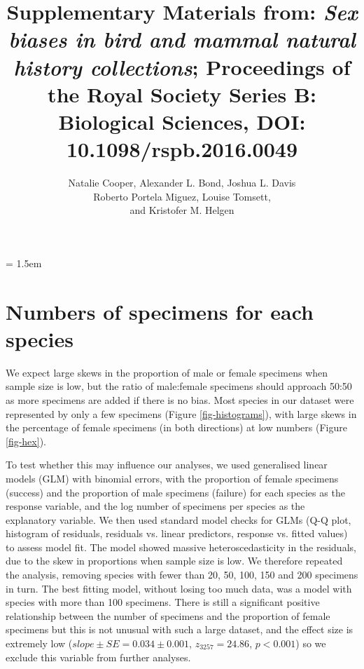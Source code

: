 \documentclass[a4paper, 12pt]{article}
\title{Supplementary Materials from: \textit{Sex biases in bird and mammal natural history collections}; Proceedings of the Royal Society Series B: Biological Sciences, DOI: 10.1098/rspb.2016.0049}
\author{Natalie Cooper, 
  Alexander L. Bond,
  Joshua L. Davis\\
  Roberto Portela Miguez,
  Louise Tomsett, \\ and
  Kristofer M. Helgen}
\date{}
\begin{document}
\maketitle

\tableofcontents

\parindent = 1.5em
\addtolength{\parskip}{.3em}


\newpage
\section{Numbers of specimens for each species}

We expect large skews in the proportion of male or female specimens when sample size is low, but the ratio of male:female specimens should approach 50:50 as more specimens are added if there is no bias. 
Most species in our dataset were represented by only a few specimens (Figure \ref{fig-histograms}), with large skews in the percentage of female specimens (in both directions) at low numbers (Figure \ref{fig-hex}).

To test whether this may influence our analyses, we used generalised linear models (GLM) with binomial errors, with the proportion of female specimens (success) and the proportion of male specimens (failure) for each species as the response variable, and the log number of specimens per species as the explanatory variable. 
We then used standard model checks for GLMs (Q-Q plot, histogram of residuals, residuals vs. linear predictors, response vs. fitted values) to assess model fit. 
The model showed massive heteroscedasticity in the residuals, due to the skew in proportions when sample size is low. 
We therefore repeated the analysis, removing species with fewer than 20, 50, 100, 150 and 200 specimens in turn. 
The best fitting model, without losing too much data, was a model with species with more than 100 specimens. 
There is still a significant positive relationship between the number of specimens and the proportion of female specimens but this is not unusual with such a large dataset, and the effect size is extremely low ($slope \pm SE = 0.034 \pm 0.001$, $z_3257 = 24.86$, $p < 0.001$) so we exclude this variable from further analyses.
\end{document}

